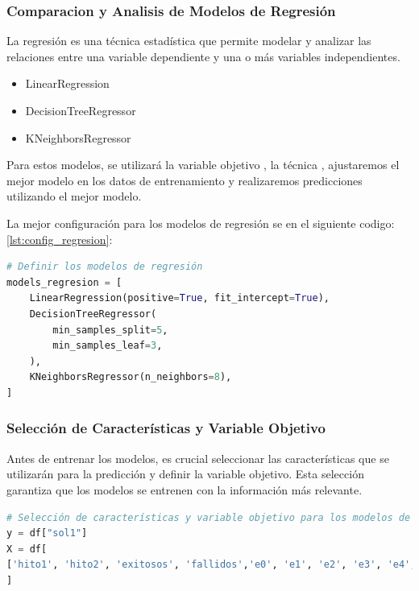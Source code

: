 \subsubsection{Comparacion y Analisis de Modelos de Regresión}

La regresión es una técnica estadística que permite modelar y analizar las relaciones entre una variable dependiente y una o más variables independientes.

\begin{itemize}
    \item LinearRegression
    \item DecisionTreeRegressor
    \item KNeighborsRegressor
\end{itemize}

Para estos modelos, se utilizará la variable objetivo , la técnica , ajustaremos el mejor modelo en los datos de entrenamiento y realizaremos predicciones utilizando el mejor modelo.

La mejor configuración para los modelos de regresión se en el siguiente codigo: \ref{lst:config_regresion}:

\begin{lstlisting}[language=Python, caption=Configuración de los modelos de regresión, label=lst:config_regresion]
# Definir los modelos de regresión
models_regresion = [
    LinearRegression(positive=True, fit_intercept=True),
    DecisionTreeRegressor(
        min_samples_split=5,
        min_samples_leaf=3,
    ),
    KNeighborsRegressor(n_neighbors=8),
]
    \end{lstlisting}


\subsubsection{Selección de Características y Variable Objetivo}
Antes de entrenar los modelos, es crucial seleccionar las características que se utilizarán para la predicción y definir la variable objetivo. Esta selección garantiza que los modelos se entrenen con la información más relevante.

\begin{lstlisting}[language=Python, caption=Seleccion de caracteristica y variable objetivo, label=lst:config_varObjetivoCaracteristicas]
# Selección de características y variable objetivo para los modelos de Regresion.
y = df["sol1"]
X = df[
['hito1', 'hito2', 'exitosos', 'fallidos','e0', 'e1', 'e2', 'e3', 'e4', 'e5', 'e6', 'e7', 'e8', 'e9', 'e10', 'e11', 'e12', 'e13', 'e14', 'e15', 'e16', 'e17', 'e18', 'e19', 'e20', 'e21', 'e22', 'e23', 'e24', 'e25', 'e26', 'e27', 'e28', 'e29', 'e30', 'e31', 'e32', 'e33', 'e34', 'e35', 'e36', 'e37', 'e38', 'e39', 'e40', 'e41', 'e42', 'e43', 'e44', 'e45', 'e46', 'e47', 'e48', 'e49', 'e50', 'e51', 'e52']
]
\end{lstlisting}


